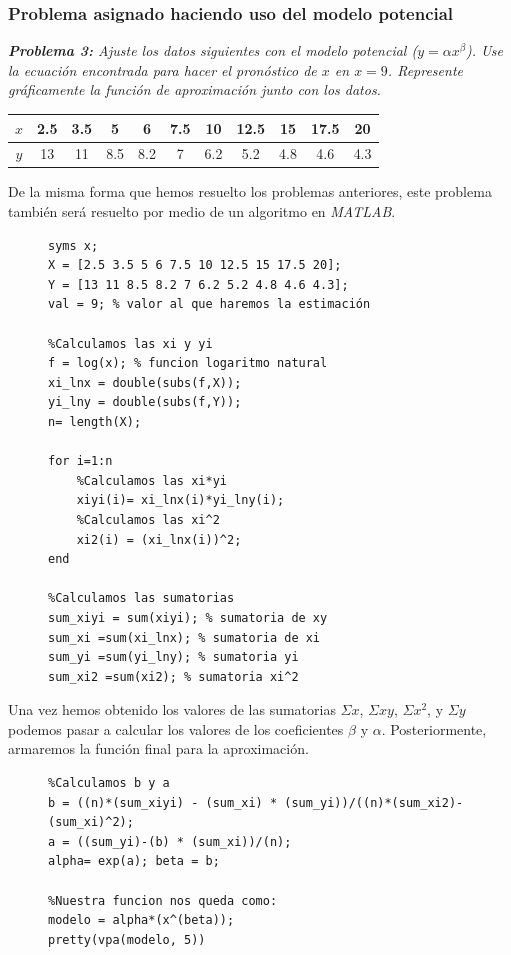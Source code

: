 \documentclass[11pt,letterpaper]{article}
\begin{document}
\subsubsection*{\textcolor{Mahogany}{Problema asignado haciendo uso del modelo potencial}}
\begin{center}
\textit{\textbf{Problema 3:} Ajuste los datos siguientes con el modelo potencial ($y = \alpha x^\beta$). Use la ecuación encontrada para hacer el pronóstico de $x$ en $x=9$. Represente gráficamente la función de aproximación junto con los datos.}
\linebreak\par
\begin{tabular}{c|cccccccccc}
\hline 
$x$ & 2.5 & 3.5 & 5 & 6 & 7.5 & 10 & 12.5 & 15 & 17.5 & 20 \\ 
\hline 
$y$ & 13 & 11 & 8.5 & 8.2 & 7 & 6.2 & 5.2 & 4.8 & 4.6 & 4.3 \\ 
\hline 
\end{tabular} 
\end{center}
De la misma forma que hemos resuelto los problemas anteriores, este problema también será resuelto por medio de un algoritmo en \textit{MATLAB}.
\begin{figure}[H]
\begin{tcolorbox}[title = Problema 3: Valores y sumas iniciales para linealización]
\begin{verbatim}
syms x;
X = [2.5 3.5 5 6 7.5 10 12.5 15 17.5 20];
Y = [13 11 8.5 8.2 7 6.2 5.2 4.8 4.6 4.3];
val = 9; % valor al que haremos la estimación

%Calculamos las xi y yi
f = log(x); % funcion logaritmo natural
xi_lnx = double(subs(f,X));
yi_lny = double(subs(f,Y));
n= length(X);

for i=1:n
    %Calculamos las xi*yi
    xiyi(i)= xi_lnx(i)*yi_lny(i);
    %Calculamos las xi^2
    xi2(i) = (xi_lnx(i))^2;
end

%Calculamos las sumatorias
sum_xiyi = sum(xiyi); % sumatoria de xy
sum_xi =sum(xi_lnx); % sumatoria de xi
sum_yi =sum(yi_lny); % sumatoria yi
sum_xi2 =sum(xi2); % sumatoria xi^2
\end{verbatim}
\end{tcolorbox}
\end{figure}
Una vez hemos obtenido los valores de las sumatorias $\Sigma x$, $\Sigma xy$, $\Sigma x^2$, y $\Sigma y$ podemos pasar a calcular los valores de los coeficientes $\beta$ y $\alpha$. Posteriormente, armaremos la función final para la aproximación.
\begin{figure}[H]
\begin{tcolorbox}[title = Problema 3: Obteniendo los coeficientes y la función de aproximación]
\begin{verbatim}
%Calculamos b y a
b = ((n)*(sum_xiyi) - (sum_xi) * (sum_yi))/((n)*(sum_xi2)-(sum_xi)^2);
a = ((sum_yi)-(b) * (sum_xi))/(n);
alpha= exp(a); beta = b;

%Nuestra funcion nos queda como:
modelo = alpha*(x^(beta));
pretty(vpa(modelo, 5))
\end{verbatim}
\end{tcolorbox}
\end{figure}
\end{document}
